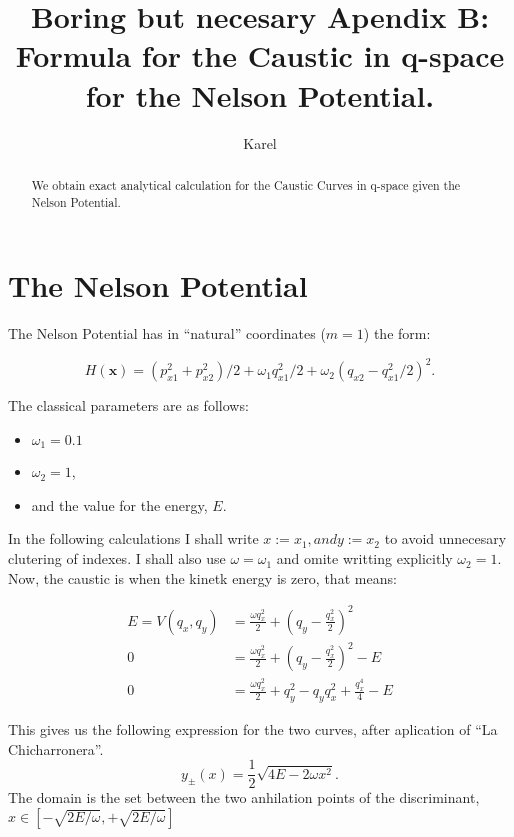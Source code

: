 \documentclass[a4paper,12pt]{article}
\title{ Boring but necesary Apendix B: Formula for the
Caustic in q-space for the Nelson Potential.}
\author{Karel}
\newcommand{\xfase}{\mathbf{x}}
\begin{document}
\maketitle

\begin{abstract}
We obtain exact analytical calculation for the Caustic 
Curves in q-space given the Nelson Potential.
\end{abstract}


\section{The Nelson Potential}

The Nelson Potential has in ``natural'' coordinates ($m=1$) the form:

\begin{equation}\label{classicalhamiltonian}
H(\xfase)=(p_{x1}^2+p_{x2}^2)/2+\omega_1 q_{x1}^2/2+
\omega_2(q_{x2}-q_{x1}^2/2)^2.
\end{equation}

The classical parameters are as follows:
\begin{itemize}
\item  $\omega_1=0.1$ 
\item $\omega_2=1$,
\item and the value for the energy, $E$.
\end{itemize}


In the following calculations I shall write $x:=x_1, and y:=x_2$
to avoid unnecesary clutering of indexes. I shall also use
$\omega=\omega_1$ and omite writting explicitly  $\omega_2=1$.
Now, the caustic is when the kinetk energy is zero, that means:

\begin{align}
E=V(q_x, q_y) & =  \frac{\omega q_x^2}{2}+(q_y - \frac{q_x^2}{2})^2 \\
0 &=  \frac{\omega q_x^2}{2}+(q_y - \frac{q_x^2}{2})^2  -E \\
0 &=  \frac{\omega q_x^2}{2}+ q_y^2 - q_yq_x^2 +\frac{q_x^4}{4} -E
\end{align}

This gives us the following expression for the two curves, after
aplication of ``La Chicharronera''.
\begin{equation}
y_{\pm}(x)=\frac{1}{2}\sqrt{4E-2\omega x^2}.
\end{equation}
The domain is the set between the two anhilation points of the 
discriminant, $x\in [-\sqrt{2E/\omega},+\sqrt{2E/\omega} ]$
\end{document}
